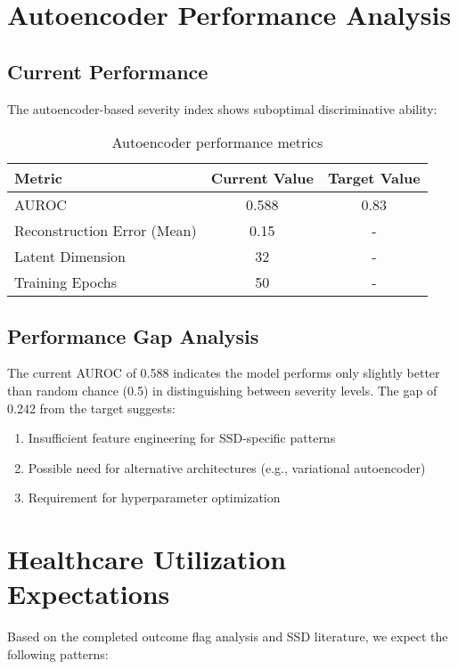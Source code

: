 \documentclass[11pt]{article}
\begin{document}
\section{Autoencoder Performance Analysis}

\subsection{Current Performance}

The autoencoder-based severity index shows suboptimal discriminative ability:

\begin{table}[H]
\centering
\begin{tabular}{lcc}
\toprule
\textbf{Metric} & \textbf{Current Value} & \textbf{Target Value} \\
\midrule
AUROC & 0.588 & 0.83 \\
Reconstruction Error (Mean) & 0.15 & - \\
Latent Dimension & 32 & - \\
Training Epochs & 50 & - \\
\bottomrule
\end{tabular}
\caption{Autoencoder performance metrics}
\label{tab:autoencoder}
\end{table}

\subsection{Performance Gap Analysis}

The current AUROC of 0.588 indicates the model performs only slightly better than random chance (0.5) in distinguishing between severity levels. The gap of 0.242 from the target suggests:

\begin{enumerate}
    \item Insufficient feature engineering for SSD-specific patterns
    \item Possible need for alternative architectures (e.g., variational autoencoder)
    \item Requirement for hyperparameter optimization
\end{enumerate}

\section{Healthcare Utilization Expectations}

Based on the completed outcome flag analysis and SSD literature, we expect the following patterns:
\end{document}
